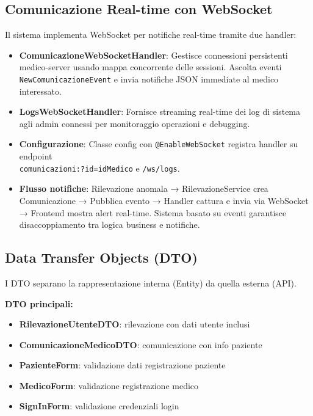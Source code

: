 \documentclass{report}
\begin{document}
\subsection{Comunicazione Real-time con WebSocket}
Il sistema implementa WebSocket per notifiche real-time tramite due handler:

\begin{itemize}
    \item \textbf{ComunicazioneWebSocketHandler}: Gestisce connessioni persistenti medico-server usando mappa 
    concorrente delle sessioni. Ascolta eventi \texttt{NewComunicazioneEvent} e invia notifiche JSON immediate 
    al medico interessato.

    \item \textbf{LogsWebSocketHandler}: Fornisce streaming real-time dei log di sistema agli admin connessi per 
    monitoraggio operazioni e debugging.

    \item \textbf{Configurazione}: Classe config con \texttt{@EnableWebSocket} registra 
    handler su endpoint\\ \texttt{comunicazioni:?id=idMedico} e \texttt{/ws/logs}.

    \item \textbf{Flusso notifiche}: Rilevazione anomala → RilevazioneService crea Comunicazione → Pubblica 
    evento → Handler cattura e invia via WebSocket → Frontend mostra alert real-time. Sistema basato su eventi 
    garantisce disaccoppiamento tra logica business e notifiche.

\end{itemize}

\subsection{Data Transfer Objects (DTO)}

I DTO separano la rappresentazione interna (Entity) da quella esterna (API).

\textbf{DTO principali:}
\begin{itemize}
    \item \textbf{RilevazioneUtenteDTO}: rilevazione con dati utente inclusi
    \item \textbf{ComunicazioneMedicoDTO}: comunicazione con info paziente
    \item \textbf{PazienteForm}: validazione dati registrazione paziente
    \item \textbf{MedicoForm}: validazione registrazione medico
    \item \textbf{SignInForm}: validazione credenziali login
\end{itemize}
\end{document}
